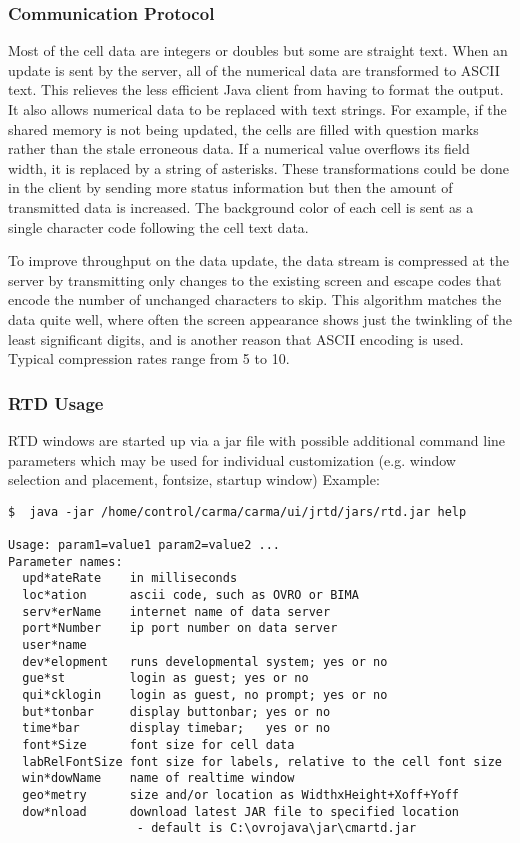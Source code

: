 \documentclass[preprint]{aastex}
\begin{document}
\subsubsection{Communication Protocol}
Most of the cell data are integers or doubles but some are straight text.
When an update is sent by the server, all of the numerical data are
transformed to ASCII text.  This relieves the less efficient Java client
from having to format the output.  It also allows numerical data to be
replaced with text strings.  For example, if the shared memory is not
being updated, the cells are filled with question marks rather than the
stale erroneous data.  If a numerical value overflows its field width,
it is replaced by a string of asterisks.  These transformations could be
done in the client by sending more status information but then the amount
of transmitted data is increased.  The background color of each cell is
sent as a single character code following the cell text data.

To improve throughput on the data update, the data stream is compressed
at the server by transmitting only changes to the existing screen and
escape codes that encode the number of unchanged characters to skip.
This algorithm matches the data quite well, where often the screen
appearance shows just the twinkling of the least significant digits,
and is another reason that ASCII encoding is used.  Typical compression
rates range from 5 to 10.

\subsubsection{RTD Usage}

RTD windows are started up via a jar file with possible additional 
command line parameters which may be used for individual 
customization (e.g. window selection and placement, fontsize, startup
window)
Example:

\begin{verbatim}
$  java -jar /home/control/carma/carma/ui/jrtd/jars/rtd.jar help

Usage: param1=value1 param2=value2 ...
Parameter names:
  upd*ateRate    in milliseconds
  loc*ation      ascii code, such as OVRO or BIMA
  serv*erName    internet name of data server
  port*Number    ip port number on data server
  user*name
  dev*elopment   runs developmental system; yes or no
  gue*st         login as guest; yes or no
  qui*cklogin    login as guest, no prompt; yes or no
  but*tonbar     display buttonbar; yes or no
  time*bar       display timebar;   yes or no
  font*Size      font size for cell data
  labRelFontSize font size for labels, relative to the cell font size
  win*dowName    name of realtime window
  geo*metry      size and/or location as WidthxHeight+Xoff+Yoff
  dow*nload      download latest JAR file to specified location 
                  - default is C:\ovrojava\jar\cmartd.jar
\end{verbatim}
\end{document}
